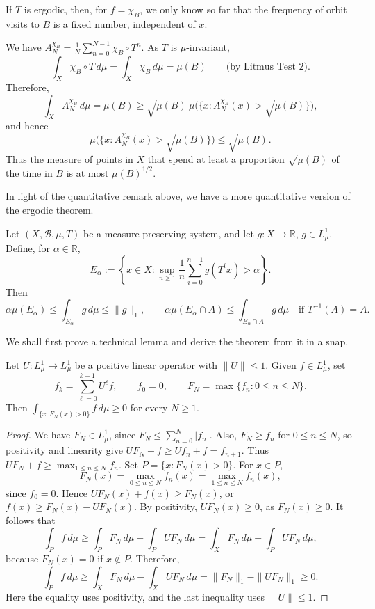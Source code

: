 \documentclass[11pt,a4paper]{article}
\begin{document}
\begin{remark}
\label{rem:l3-frequency}
If $T$ is ergodic, then, for $f=\chi_B$, we only know so far that the
frequency of orbit visits to $B$ is a fixed number, independent of $x$.
\end{remark}
\begin{remark}
We have $A_N^{\chi_B}=\frac1N\sum_{n=0}^{N-1}\chi_B\circ T^n$.
As $T$ is $\mu$-invariant,
\[
 \int_X\chi_B\circ T\,d\mu=\int_X\chi_B\,d\mu=\mu(B)
 \qquad\text{(by Litmus Test 2).}
\]
Therefore,
\[
 \int_X A_N^{\chi_B}\,d\mu=\mu(B)
 \geq\sqrt{\mu(B)}\,
 \mu\bigl(\{x:A_N^{\chi_B}(x)>\sqrt{\mu(B)}\}\bigr),
\]
and hence
\[
 \mu\bigl(\{x:A_N^{\chi_B}(x)>\sqrt{\mu(B)}\}\bigr)
 \leq\sqrt{\mu(B)}.
\]
Thus the measure of points in $X$ that spend at least a proportion
$\sqrt{\mu(B)}$ of the time in $B$ is at most $\mu(B)^{1/2}$.
\end{remark}
In light of the quantitative remark above, we have a more quantitative
version of the ergodic theorem.

\setcounter{theorem}{11}\begin{theorem}
\label{thm:l3-maximal}
Let $(X,\mathcal B,\mu,T)$ be a measure-preserving system, and let
$g:X\to\mathbb R$, $g\in L^1_\mu$. Define, for $\alpha\in\mathbb R$,
\[
 E_\alpha:=\left\{x\in X:
 \sup_{n\geq1}\frac1n\sum_{i=0}^{n-1}g(T^ix)>\alpha\right\}.
\]
Then
\[
 \alpha\mu(E_\alpha)\leq\int_{E_\alpha}g\,d\mu\leq\|g\|_1,
 \qquad
 \alpha\mu(E_\alpha\cap A)\leq\int_{E_\alpha\cap A}g\,d\mu
 \quad\text{if }T^{-1}(A)=A.
\]
\end{theorem}

We shall first prove a technical lemma and derive the theorem from it in a
snap.
\setcounter{theorem}{12}\begin{lemma}
\label{lem:l3-positive}
Let $U:L^1_\mu\to L^1_\mu$ be a positive linear operator with
$\|U\|\leq1$. Given $f\in L^1_\mu$, set
\[
 f_k=\sum_{\ell=0}^{k-1}U^\ell f,\qquad f_0=0,
 \qquad F_N=\max\{f_n:0\leq n\leq N\}.
\]
Then $\int_{\{x:F_N(x)>0\}}f\,d\mu\geq0$ for every $N\geq1$.
\end{lemma}
\begin{proof}
We have $F_N\in L^1_\mu$, since $F_N\leq\sum_{n=0}^N|f_n|$.
Also, $F_N\geq f_n$ for $0\leq n\leq N$, so positivity and linearity give
$UF_N+f\geq Uf_n+f=f_{n+1}$. Thus
$UF_N+f\geq\max_{1\leq n\leq N}f_n$.
Set $P=\{x:F_N(x)>0\}$. For $x\in P$,
\[
 F_N(x)=\max_{0\leq n\leq N}f_n(x)
       =\max_{1\leq n\leq N}f_n(x),
\]
since $f_0=0$. Hence $UF_N(x)+f(x)\geq F_N(x)$, or
$f(x)\geq F_N(x)-UF_N(x)$. By positivity, $UF_N(x)\geq0$, as
$F_N(x)\geq0$. It follows that
\[
 \int_P f\,d\mu
 \geq\int_P F_N\,d\mu-\int_P UF_N\,d\mu
 =\int_XF_N\,d\mu-\int_PUF_N\,d\mu,
\]
because $F_N(x)=0$ if $x\notin P$. Therefore,
\[
 \int_Pf\,d\mu\geq\int_XF_N\,d\mu-\int_XUF_N\,d\mu
 =\|F_N\|_1-\|UF_N\|_1\geq0.
\]
Here the equality uses positivity, and the last inequality uses $\|U\|\leq1$.
\end{proof}
\end{document}
